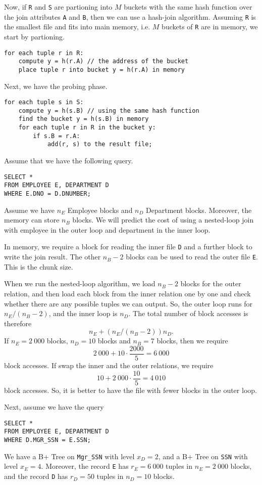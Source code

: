 \documentclass[a4paper, openany]{memoir}
\theoremstyle{definition}
\theoremstyle{plain}
\begin{document}
Now, if \texttt{R} and \texttt{S} are partioning into $M$ buckets with the same hash function over the join attributes \texttt{A} and \texttt{B}, then we can use a hash-join algorithm. Assuming \texttt{R} is the smallest file and fits into main memory, i.e. $M$ buckets of \texttt{R} are in memory, we start by partioning.
\begin{verbatim}
for each tuple r in R:
    compute y = h(r.A) // the address of the bucket
    place tuple r into bucket y = h(r.A) in memory
\end{verbatim}
Next, we have the probing phase.
\begin{verbatim}
for each tuple s in S:
    compute y = h(s.B) // using the same hash function
    find the bucket y = h(s.B) in memory
    for each tuple r in R in the bucket y:
        if s.B = r.A:
            add(r, s) to the result file;
\end{verbatim}

Assume that we have the following query.
\begin{verbatim}
SELECT *
FROM EMPLOYEE E, DEPARTMENT D
WHERE E.DNO = D.DNUMBER;
\end{verbatim}
Assume we have $n_E$ Employee blocks and $n_D$ Department blocks. Moreover, the memory can store $n_B$ blocks. We will predict the cost of using a nested-loop join with employee in the outer loop and department in the inner loop.

In memory, we require a block for reading the inner file \texttt{D} and a further block to write the join result. The other $n_B - 2$ blocks can be used to read the outer file \texttt{E}. This is the chunk size.

When we run the nested-loop algorithm, we load $n_B - 2$ blocks for the outer relation, and then load each block from the inner relation one by one and check whether there are any possible tuples we can output. So, the outer loop runs for $n_E/(n_B - 2)$, and the inner loop is $n_D$. The total number of block accesses is therefore
\[n_E + (n_E/(n_B - 2))n_D.\]
If $n_E = 2 \ 000$ blocks, $n_D = 10$ blocks and $n_B = 7$ blocks, then we require 
\[2 \ 000 + 10 \cdot \frac{2000}{5} = 6 \ 000\]
block accesses. If swap the inner and the outer relations, we require
\[10 + 2 \ 000 \cdot \frac{10}{5} = 4 \ 010\]
block accesses. So, it is better to have the file with fewer blocks in the outer loop.

Next, assume we have the query
\begin{verbatim}
SELECT *
FROM EMPLOYEE E, DEPARTMENT D
WHERE D.MGR_SSN = E.SSN;
\end{verbatim}
We have a B+ Tree on \texttt{Mgr\_SSN} with level $x_D = 2$, and a B+ Tree on \texttt{SSN} with level $x_E = 4$. Moreover, the record \texttt{E} has $r_E = 6 \ 000$ tuples in $n_E = 2 \ 000$ blocks, and the record \texttt{D} has $r_D = 50$ tuples in $n_D = 10$ blocks. 
\end{document}
